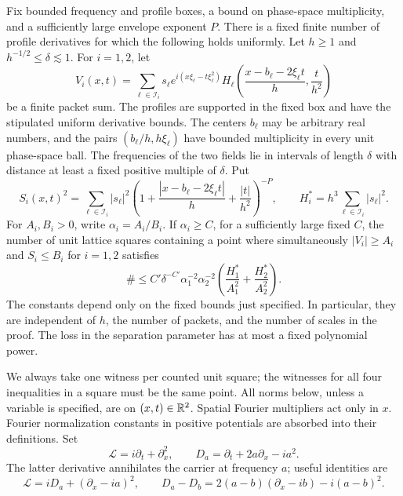 \begin{theorem}\label{thm:frame}
Fix bounded frequency and profile boxes, a bound on phase-space
multiplicity, and a sufficiently large envelope exponent $P$.
There is a fixed finite number of profile derivatives for which the
following holds uniformly.  Let $h\geq1$ and
$h^{-1/2}\leq\delta\lesssim1$.  For $i=1,2$, let
\[
 V_i(x,t)=\sum_{\ell\in\mathcal I_i}s_\ell
 e^{i(x\xi_\ell-t\xi_\ell^2)}
 H_\ell\left(\frac{x-b_\ell-2\xi_\ell t}{h},\frac{t}{h^2}\right)
\]
be a finite packet sum.  The profiles are supported in the fixed box
and have the stipulated uniform derivative bounds.  The centers $b_\ell$
may be arbitrary real numbers, and the pairs
$(b_\ell/h,h\xi_\ell)$ have bounded multiplicity in every unit
phase-space ball.  The frequencies of the two fields lie in intervals
of length $\delta$ with distance at least a fixed positive multiple of
$\delta$.  Put
\[
 S_i(x,t)^2=\sum_{\ell\in\mathcal I_i}|s_\ell|^2
 \left(1+\frac{|x-b_\ell-2\xi_\ell t|}{h}
             +\frac{|t|}{h^2}\right)^{-P},
 \qquad H_i^*=h^3\sum_{\ell\in\mathcal I_i}|s_\ell|^2.
\]
For $A_i,B_i>0$, write $\alpha_i=A_i/B_i$.  If
$\alpha_i\geq C$, for a sufficiently large fixed $C$, the number of
unit lattice squares containing a point where simultaneously
$|V_i|\geq A_i$ and $S_i\leq B_i$ for $i=1,2$ satisfies
\begin{equation}\label{eq:src8}
 \#\leq C'\delta^{-C'}\alpha_1^{-2}\alpha_2^{-2}
 \left(\frac{H_1^*}{A_1^2}+\frac{H_2^*}{A_2^2}\right).
\end{equation}
The constants depend only on the fixed bounds just specified.  In
particular, they are independent of $h$, the number of packets, and the
number of scales in the proof.  The loss in the separation parameter
has at most a fixed polynomial power.
\end{theorem}

We always take one witness per counted unit square; the witnesses for
all four inequalities in a square must be the same point.  All norms
below, unless a variable is specified, are on $(x,t)\in\mathbb R^2$.  Spatial
Fourier multipliers act only in $x$.  Fourier normalization constants
in positive potentials are absorbed into their definitions.  Set
\[
 \mathcal L=i\partial_t+\partial_x^2,
 \qquad D_a=\partial_t+2a\partial_x-ia^2.
\]
The latter derivative annihilates the carrier at frequency $a$; useful
identities are
\begin{equation}\label{eq:frame-derivatives}
 \mathcal L=iD_a+(\partial_x-ia)^2,
 \qquad
 D_a-D_b=2(a-b)(\partial_x-ib)-i(a-b)^2.
\end{equation}

